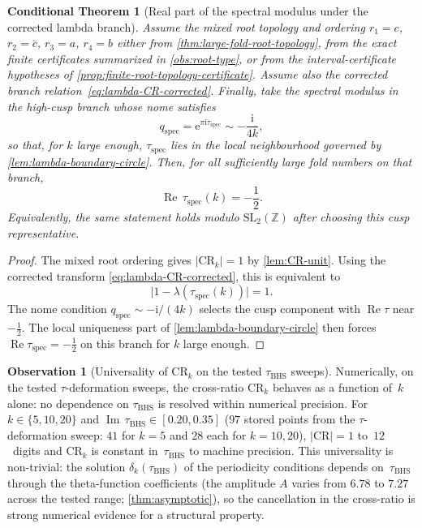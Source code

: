 \documentclass[11pt,a4paper]{article}
\theoremstyle{plain}
\newtheorem{conditionaltheorem}[theorem]{Conditional Theorem}
\theoremstyle{definition}
\newtheorem{observation}[theorem]{Observation}
\theoremstyle{remark}
\DeclareMathOperator{\Real}{Re}
\DeclareMathOperator{\Imag}{Im}
\newcommand{\ZZ}{\mathbb{Z}}
\newcommand{\ee}{\mathrm{e}}
\newcommand{\ii}{\mathrm{i}}
\newcommand{\abs}[1]{\lvert #1 \rvert}
\begin{document}
\begin{conditionaltheorem}[Real part of the spectral modulus under the
  corrected lambda branch]
\label{prop:tau-univ}
Assume the mixed root topology and ordering
$r_1=c$, $r_2=\bar c$, $r_3=a$, $r_4=b$ either from
\cref{thm:large-fold-root-topology}, from the exact finite certificates
summarized in \cref{obs:root-type}, or from the interval-certificate
hypotheses of \cref{prop:finite-root-topology-certificate}.  Assume
also the corrected branch relation~\eqref{eq:lambda-CR-corrected}.
Finally, take the spectral modulus in the high-cusp branch whose nome
satisfies
\[
  q_{\mathrm{spec}}=
  \ee^{\pi\ii\tau_{\mathrm{spec}}}
  \sim -\frac{\ii}{4k},
\]
so that, for $k$ large enough, $\tau_{\mathrm{spec}}$ lies in the
local neighbourhood governed by \cref{lem:lambda-boundary-circle}.
Then, for all sufficiently large fold numbers on that branch,
\begin{equation}\label{eq:Re-tau-spec-minus-half}
  \Real\,\tau_{\mathrm{spec}}(k)=-\frac12 .
\end{equation}
Equivalently, the same statement holds modulo $\mathrm{SL}_2(\ZZ)$
after choosing this cusp representative.
\end{conditionaltheorem}

\begin{proof}
The mixed root ordering gives $\abs{\mathrm{CR}_k}=1$ by
\cref{lem:CR-unit}.  Using the corrected transform
\eqref{eq:lambda-CR-corrected}, this is equivalent to
\[
  \abs{1-\lambda(\tau_{\mathrm{spec}}(k))}=1.
\]
The nome condition $q_{\mathrm{spec}}\sim-\ii/(4k)$ selects the cusp
component with $\Real\tau$ near $-\tfrac12$.  The local uniqueness
part of \cref{lem:lambda-boundary-circle} then forces
$\Real\tau_{\mathrm{spec}}=-\tfrac12$ on this branch for $k$ large
enough.
\end{proof}

\begin{observation}[Universality of $\mathrm{CR}_k$ on the tested
  $\tau_{\mathrm{BHS}}$ sweeps]
\label{obs:CR-universal}
Numerically, on the tested $\tau$-deformation sweeps, the cross-ratio
$\mathrm{CR}_k$ behaves as a function of~$k$ alone: no dependence on
$\tau_{\mathrm{BHS}}$ is resolved within numerical precision.
For $k \in \{5, 10, 20\}$ and
$\Imag\,\tau_{\mathrm{BHS}} \in [0.20, 0.35]$
($97$ stored points from the $\tau$-deformation sweep:
$41$ for $k=5$ and $28$ each for $k=10,20$),
$\lvert\mathrm{CR}\rvert = 1$ to~$12$~digits and 
$\mathrm{CR}_k$ is constant in~$\tau_{\mathrm{BHS}}$
to machine precision.
This universality is non-trivial: the solution
$\delta_k(\tau_{\mathrm{BHS}})$ of the periodicity conditions
depends on~$\tau_{\mathrm{BHS}}$ through the theta-function
coefficients (the amplitude $A$ varies from $6.78$ to $7.27$
across the tested range; \cref{thm:asymptotic}), so the
cancellation in the cross-ratio is strong numerical evidence for a
structural property.
\end{observation}
\end{document}
